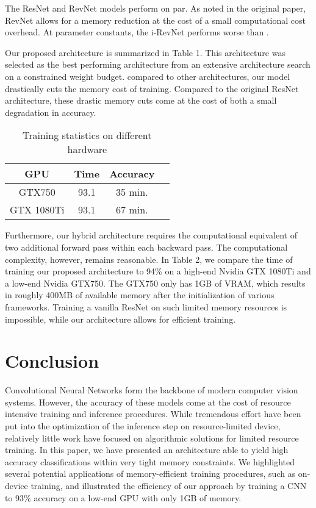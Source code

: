 \documentclass[twocolumn]{bmcart}
\begin{document}
The ResNet and RevNet models perform on par.
As noted in the original paper, RevNet allows for a memory reduction at the cost of
a small computational cost overhead.
At parameter constants, the i-RevNet performs worse than .

Our proposed architecture is summarized in Table 1.
This architecture was selected as the best performing architecture 
from an extensive architecture search on a constrained weight budget. 
compared to other architectures, our model drastically cuts the memory cost of training.
Compared to the original ResNet architecture, these drastic memory cuts come at the cost of 
both a small degradation in accuracy.

\begin{table}[h]
\begin{tabular}{ c c c c}	
 GPU & Time & Accuracy \\
\hline			
GTX750     & 93.1  & 35 min.    \\
GTX 1080Ti & 93.1  & 67 min.  \\
\hline
\end{tabular}
\caption{Training statistics on different hardware}
\end{table}

Furthermore, our hybrid architecture requires the computational equivalent of two additional forward pass within each backward pass.
The computational complexity, however, remains reasonable. 
In Table 2, we compare the time of training our proposed architecture to 94\% on a high-end Nvidia GTX 1080Ti and a low-end
Nvidia GTX750.
The GTX750 only has 1GB of VRAM, which results in roughly 400MB of available memory after the initialization of various frameworks.
Training a vanilla ResNet on such limited memory resources is impossible, while our architecture allows for efficient training. 

\section{Conclusion}

Convolutional Neural Networks form the backbone of modern computer vision systems.
However, the accuracy of these models come at the cost of resource intensive training and inference procedures.
While tremendous effort have been put into the optimization of the inference step on resource-limited device, 
relatively little work have focused on algorithmic solutions for limited resource training. 
In this paper, we have presented an architecture able to yield high accuracy classifications within very tight memory constraints.
We highlighted several potential applications of memory-efficient training procedures, such as on-device training,
and illustrated the efficiency of our approach by training a CNN to 93\% accuracy on a low-end GPU with only 1GB of memory.
\end{document}
